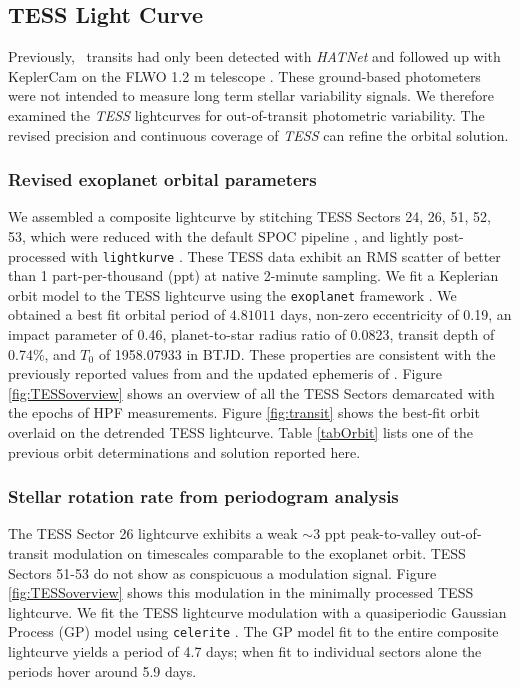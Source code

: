 \documentclass[twocolumn]{aastex631}
\newcommand{\hatp}{\object{HAT-P-67}~}
\begin{document}
\subsection{TESS Light Curve}
Previously, \hatp transits had only been detected with \emph{HATNet} \citep{2004PASP..116..266B} and followed up with KeplerCam on the FLWO 1.2 m telescope \citep{2017AJ....153..211Z}. These ground-based photometers were not intended to measure long term stellar variability signals.  We therefore examined the \emph{TESS} lightcurves for out-of-transit photometric variability.  The revised precision and continuous coverage of \emph{TESS} can refine the orbital solution.

\subsubsection{Revised exoplanet orbital parameters}
We assembled a composite lightcurve by stitching TESS Sectors 24, 26, 51, 52, 53, which were reduced with the default SPOC pipeline \citep{2020RNAAS...4..201C}, and lightly post-processed with \texttt{lightkurve} \citep{geert_barentsen_2019_2565212}.  These TESS data exhibit an RMS scatter of better than 1 part-per-thousand (ppt) at native 2-minute sampling.  We fit a Keplerian orbit model to the TESS lightcurve using the \texttt{exoplanet} framework \citep{exoplanet:joss}.  We obtained a best fit orbital period of $4.81011$ days, non-zero eccentricity of 0.19, an impact parameter of 0.46, planet-to-star radius ratio of 0.0823, transit depth of 0.74\%, and $T_0$ of 1958.07933 in BTJD.  These properties are consistent with the previously reported values from \citet{2017AJ....153..211Z} and the updated ephemeris of \citet{2022ApJS..259...62I}.  Figure \ref{fig:TESSoverview} shows an overview of all the TESS Sectors demarcated with the epochs of HPF measurements.  Figure \ref{fig:transit} shows the best-fit orbit overlaid on the detrended TESS lightcurve.  Table \ref{tabOrbit} lists one of the previous orbit determinations and solution reported here.

\subsubsection{Stellar rotation rate from periodogram analysis}

The TESS Sector 26 lightcurve exhibits a weak $\sim$3 ppt peak-to-valley out-of-transit modulation on timescales comparable to the exoplanet orbit. TESS Sectors 51-53 do not show as conspicuous a modulation signal.  Figure \ref{fig:TESSoverview} shows this modulation in the minimally processed TESS lightcurve.  We fit the TESS lightcurve modulation with a quasiperiodic Gaussian Process (GP) model using \texttt{celerite} \citep{celerite1,celerite2}.  The GP model fit to the entire composite lightcurve yields a period of 4.7 days; when fit to individual sectors alone the periods hover around 5.9 days.
\end{document}
